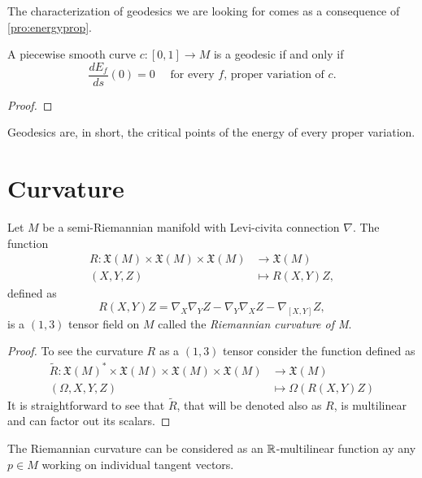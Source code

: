 The characterization of geodesics we are looking for comes as a consequence of \autoref{pro:energyprop}.

\begin{proposition}
	A piecewise smooth curve $c \colon [0,1] \to M$ is a geodesic if and only if
	\[
		\frac{dE_f}{ds}(0) = 0 \quad \textrm{ for every $f$, proper variation of $c$}.
	\]
\end{proposition}
\begin{proof}
\end{proof}

Geodesics are, in short, the critical points of the energy of every proper variation.

\section{Curvature}

\begin{lemma}
	Let $M$ be a semi-Riemannian manifold with Levi-civita connection $\nabla$. The function
	\begin{align*}
		R \colon \mathfrak{X}(M) \times \mathfrak{X}(M) \times \mathfrak{X}(M) &\to \mathfrak{X}(M) \\
		(X, Y, Z) &\mapsto R(X,Y)Z,
	\end{align*}
	defined as
	\[
		R(X,Y)Z = \nabla_X \nabla_Y Z - \nabla_Y \nabla_X Z - \nabla_{[X,Y]} Z,
	\]
	is a $(1,3)$ tensor field on $M$ called the \emph{Riemannian curvature of M}.
\end{lemma}

\begin{proof}
	To see the curvature $R$ as a $(1,3)$ tensor consider the function defined as
		\begin{align*}
		\tilde{R} \colon \mathfrak{X}(M)^* \times \mathfrak{X}(M) \times \mathfrak{X}(M) \times \mathfrak{X}(M) &\to \mathfrak{X}(M) \\
		(\Omega, X, Y, Z) &\mapsto \Omega\left(R(X,Y)Z\right)
	\end{align*}
	It is straightforward to see that $\tilde{R}$, that will be denoted also as $R$, is multilinear and can factor out its scalars.
\end{proof}

The Riemannian curvature can be considered as an $\mathbb{R}$-multilinear function ay any $p\in M$ working on individual tangent vectors.

